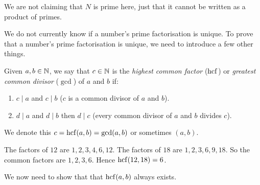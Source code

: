 \documentclass[../main.tex]{subfiles}
\begin{document}
\begin{remark}[Note]
  We are not claiming that $N$ is prime here, just that it cannot be written as a product of primes.
\end{remark}
We do not currently know if a number's prime factorisation is unique.
To prove that a number's prime factorisation is unique, we need to introduce a few other things.
\begin{definition}
  Given $a, b \in \mathbb{N}$, we say that $c \in \mathbb{N}$ is the \textit{highest common factor} ($\operatorname{hcf}$) or \textit{greatest common divisor} ($\gcd$) of $a$ and $b$ if:
  \begin{enumerate}
    \item $c \mid a$ and $c \mid b$ ($c$ is a common divisor of $a$ and $b$).
    \item $d \mid a$ and $d \mid b$ then $d \mid c$ (every common divisor of $a$ and $b$ divides $c$).
  \end{enumerate}
  We denote this $c = \operatorname{hcf}(a, b) = \gcd(a, b)$ or sometimes $(a, b)$.
\end{definition}
\begin{example}
  The factors of $12$ are $1, 2, 3, 4, 6, 12$. The factors of $18$ are $1, 2, 3, 6, 9, 18$.
  So the common factors are $1, 2, 3, 6$.
  Hence $\operatorname{hcf}(12, 18) = 6$.
\end{example}
We now need to show that that $\operatorname{hcf}(a, b)$ always exists.
\end{document}
